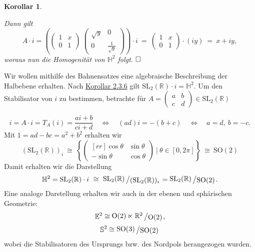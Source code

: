 \documentclass[11pt]{book}
\numberwithin{dummy}{section}
\newtheorem{corollary}[theorem]{Korollar}
\theoremstyle{nonumberbreak}
\newenvironment{pr}[1][]{\ifthenelse{\equal{#1}{}}{\proof}{\proof[#1]}\rm}{\endproof}
\newenvironment{ex}[1][]{\ifthenelse{\equal{#1}{}}{\example}{\example[#1]}\rm}{\endexample}
\newcommand{\E}{\mathbb{E}}
\newcommand{\R}{\mathbb{R}}
\newcommand{\He}{\mathbb{H}}
\newcommand{\slant}[2]{{\raisebox{.1em}{$#1$}\left/\raisebox{-.1em}{$#2$}\right.}}
\begin{document}
\begin{spacing}{1.4}
\begin{corollary}
\begin{pr}
\begin{compactenum}
Dann gilt 
$$A \cdot i = \left( \begin{pmatrix} 1 & x \\[-2pt] 0 & 1 \end{pmatrix} \ \begin{pmatrix} \sqrt{y} & 0 \\[-2pt] 0  & \frac{1}{\sqrt{y}} \end{pmatrix} \right) \cdot i \ =\ \begin{pmatrix} 1 & x \\[-2pt] 0 & 1 \end{pmatrix} \cdot (iy) \ = \ x + iy,$$
woraus nun die Homogenität von $\He^2$ folgt. $\hfill \Box$


\end{compactenum}
\end{pr}
\end{corollary}





\begin{ex}
Wir wollen mithilfe des Bahnensatzes eine algebraische Beschreibung der Halbebene erhalten. Nach \hyperlink{korollarzweidreisechs}{Korollar 2.3.6} gilt $\mathrm{SL}_2(\R) \cdot i = \He^2$. Um den Stabilisator von $i$ zu bestimmen, betrachte für $A = \begin{pmatrix}a&b \\[-6pt]c&d \end{pmatrix} \in \mathrm{SL}_2(\R)$

$$i= A\cdot i = T_A(i) = \frac{ai+b}{ci+d} \quad \Longleftrightarrow \quad (ad)i = - (b+c) \quad \Longleftrightarrow \quad a=d, \ b=-c.$$
Mit $1=ad-bc = a^2+b^2$ erhalten wir 
$$({\mathrm{SL}_2(\R)})_{i} \ \cong \ \left\{ \begin{pmatrix}[rr] \cos \theta & \sin \theta \\[-6pt] - \sin \theta & \cos \theta \end{pmatrix} \ \bigg \vert \ \theta \in [0,2\pi] \right\} \ \cong \ \mathrm{SO}(2)$$
Damit erhalten wir die Darstellung 
$$\He^2 = \mathrm{SL}_2(\R) \cdot i \ \cong \ \slant{\mathrm{SL}_2(\R)}{(\mathrm{SL}_2(\R))_i} = \slant{\mathrm{SL}_2(\R)}{\mathrm{SO}(2)}.$$
Eine analoge Darstellung erhalten wir auch in der ebenen und sphärischen Geometrie:
$$\E^2 \cong \slant{\mathrm{O}(2) \ltimes \R^2}{\mathrm{O}(2)},$$
$$\mathbb{S}^2 \cong \slant{\mathrm{SO}(3)}{\mathrm{SO}(2)}$$
wobei die Stabilisatoren des Ursprungs bzw. des Nordpols herangezogen wurden.


\end{ex}



















\end{spacing}
\end{document}
